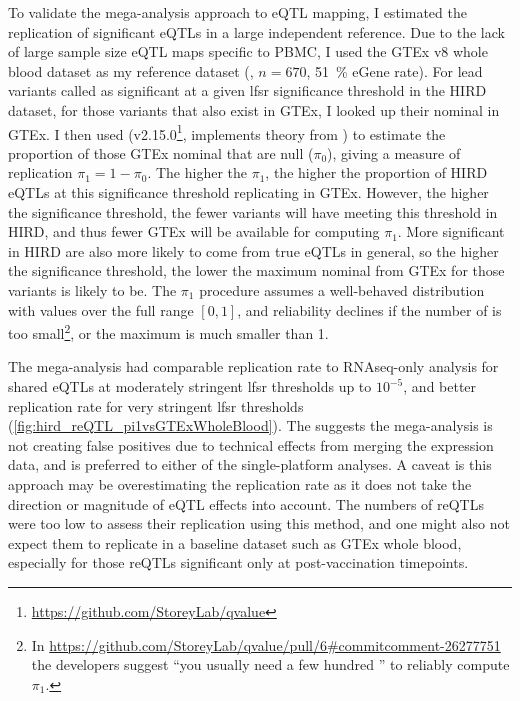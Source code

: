 To validate the mega-analysis approach to \gls{eQTL} mapping, I estimated the replication of significant \glspl{eQTL} in a large independent reference.
Due to the lack of large sample size \gls{eQTL} maps specific to \gls{PBMC}, I used the GTEx v8 whole blood dataset as my reference dataset (\autocite{thegtexconsortium2020GTExConsortiumAtlas}, $n=670$, \SI{51}{\percent} eGene rate).
For lead variants called as significant at a given \gls{lfsr} significance threshold in the \gls{HIRD} dataset, for those variants that also exist in GTEx, I looked up their nominal \pvalues{} in GTEx.
I then used  (v2.15.0\footnote{\url{https://github.com/StoreyLab/qvalue}}, implements theory from \textcite{storey2003StatisticalSignificanceGenomewide}) to estimate the proportion of those GTEx nominal \pvalues{} that are null ($\pi_0$), giving a measure of replication $\pi_1 = 1 - \pi_0$.
The higher the $\pi_1$, the higher the proportion of \gls{HIRD} \glspl{eQTL} at this significance threshold replicating in GTEx.
However, the higher the significance threshold, the fewer variants will have \pvalues{} meeting this threshold in \gls{HIRD}, and thus fewer GTEx \pvalues{} will be available for computing $\pi_1$.
More significant \pvalues{} in \gls{HIRD} are also more likely to come from true \glspl{eQTL} in general, so the higher the significance threshold, the lower the maximum nominal \pvalue{} from GTEx for those variants is likely to be.
The $\pi_1$ procedure assumes a well-behaved \pvalue{} distribution with values over the full range $\left[0, 1\right]$, 
and reliability declines if the number of \pvalues{} is too small\footnote{In \url{https://github.com/StoreyLab/qvalue/pull/6\#commitcomment-26277751} the developers suggest \enquote{you usually need a few hundred \pvalues{}} to reliably compute $\pi_1$.}, or the maximum \pvalue{} is much smaller than 1.

The mega-analysis had comparable replication rate to \gls{RNAseq}-only analysis for shared \glspl{eQTL} at moderately stringent \gls{lfsr} thresholds up to $10^{-5}$, and better replication rate for very stringent \gls{lfsr} thresholds (\cref{fig:hird_reQTL_pi1vsGTExWholeBlood}).
The suggests the mega-analysis is not creating false positives due to technical effects from merging the expression data, and is preferred to either of the single-platform analyses. 
A caveat is this approach may be overestimating the replication rate as it does not take the direction or magnitude of \gls{eQTL} effects into account.
The numbers of \glspl{reQTL} were too low to assess their replication using this method, and one might also not expect them to replicate in a baseline dataset such as GTEx whole blood, especially for those \glspl{reQTL} significant only at post-vaccination timepoints.


